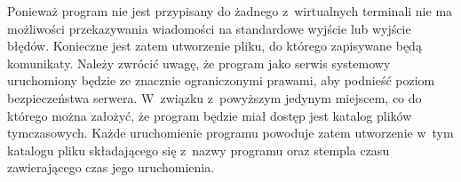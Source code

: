 Ponieważ program nie jest przypisany do żadnego z~wirtualnych
terminali nie ma możliwości przekazywania wiadomości na standardowe
wyjście lub wyjście błędów. Konieczne jest zatem utworzenie pliku, do
którego zapisywane będą komunikaty. Należy zwrócić uwagę, że program
jako serwis systemowy uruchomiony będzie ze znacznie ograniczonymi
prawami, aby podnieść poziom bezpieczeństwa serwera. W~związku
z~powyższym jedynym miejscem, co do którego można założyć, że program
będzie miał dostęp jest katalog plików tymczasowych. Każde
uruchomienie programu powoduje zatem utworzenie w~tym katalogu pliku
składającego się z~nazwy programu oraz stempla czasu zawierającego
czas jego uruchomienia.
